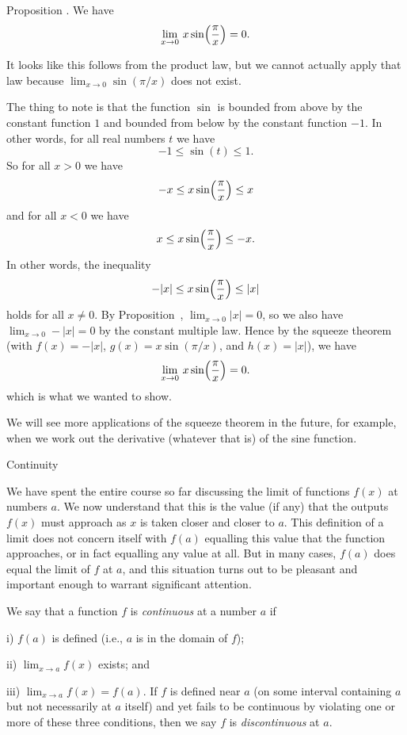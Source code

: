 \edef\propxsin{\the\thmcount}
\proclaim Proposition \advthm. We have
$$\lim_{x\to 0}\, x\sin\Bigl({\pi\over x}\Bigr) = 0.$$

\proof It looks like this follows from the product law, but we cannot actually apply that law because
$\lim_{x\to 0}\sin(\pi/x)$ does not exist.

The thing to note is that the function $\sin$ is bounded from above by the constant function $1$ and
bounded from below by the constant function $-1$. In other words, for all real numbers $t$ we have
$$-1\le \sin(t)\le 1.$$
So for all $x> 0$ we have
$$ -x\le x\sin\Bigl({\pi\over x}\Bigr) \le x $$
and for all $x<0$ we have
$$ x\le x\sin\Bigl({\pi\over x}\Bigr) \le -x.$$
In other words, the inequality
$$ -|x| \le x\sin\Bigl({\pi\over x}\Bigr) \le |x|$$
holds for all $x\ne 0$.
By Proposition~{\proplimabs}, $\lim_{x\to 0} |x| = 0$, so we also have
$\lim_{x\to 0} -|x| = 0$ by the constant multiple law.
Hence by the squeeze theorem (with $f(x) = -|x|$, $g(x) = x\sin(\pi/x)$, and $h(x) = |x|$),
we have
$$\lim_{x\to 0}\, x\sin\Bigl({\pi\over x}\Bigr) = 0.$$
which is what we wanted to show.\slug

We will see more applications of the squeeze theorem in the future, for example, when we work out the derivative
(whatever that is) of the sine function.

\goodbreak
\advsect Continuity

We have spent the entire course so far discussing the limit of functions $f(x)$ at numbers $a$. We now understand
that this is the
value (if any) that the outputs $f(x)$ must approach as $x$ is taken closer and closer to $a$.
This definition of a limit
does not concern itself with $f(a)$ equalling this value that the function approaches,
or in fact equalling any value
at all. But in many cases, $f(a)$ does equal the limit of $f$ at $a$, and this situation turns out to be
pleasant and important enough to warrant significant attention.

We say that a function $f$ is {\it continuous} at a number $a$ if
\medskip
\item{i)} $f(a)$ is defined (i.e., $a$ is in the domain of $f$);
\smallskip
\item{ii)} $\lim_{x\to a} f(x)$ exists; and
\smallskip
\item{iii)} $\lim_{x\to a} f(x) = f(a)$.
\medskip
If $f$ is defined near $a$ (on some interval containing $a$ but not necessarily at $a$ itself) and yet fails
to be continuous by violating one or more of these three conditions, then we say $f$ is {\it discontinuous}
at $a$.

